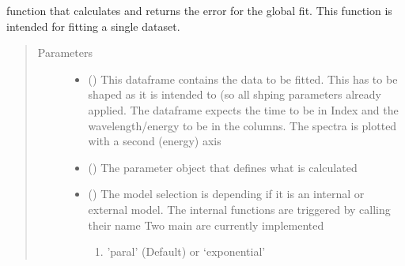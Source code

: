 \documentclass[letterpaper,10pt,english]{sphinxmanual}
\begin{document}
\begin{fulllineitems}
\label{\detokenize{plot_func:plot_func.err_func}}
function that calculates and returns the error for the global fit. This function is intended for
fitting a single dataset.
\begin{quote}\begin{description}
\item[{Parameters}] \leavevmode\begin{itemize}
\item {} 
 () \textendash{} This dataframe contains the data to be fitted. This has to be shaped as it is intended to (so all shping parameters
already applied. The dataframe expects the time to be in Index and the wavelength/energy
to be in the columns. The spectra is plotted with a second (energy) axis

\item {} 
 () \textendash{} The parameter object that defines what is calculated

\item {} 
 (\sphinxstyleliteralemphasis{\sphinxupquote{, }}) \textendash{} 
The model selection is depending if it is an internal or external model.
The internal functions are triggered by calling their name
Two main are currently implemented
\begin{enumerate}
%
\item {} 
’paral’ (Default) or ‘exponential’


\end{enumerate}
\end{itemize}
\end{description}
\end{quote}
\end{fulllineitems}
\end{document}
